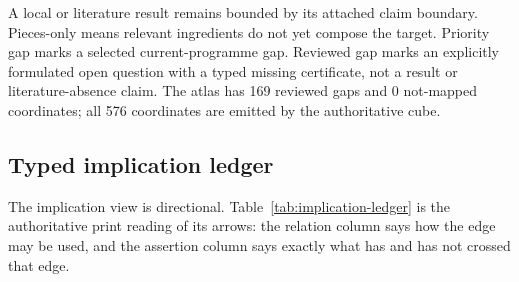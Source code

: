 A local or literature result remains bounded by its attached claim boundary.  Pieces-only means relevant ingredients do not yet compose the target.  Priority gap marks a selected current-programme gap.  Reviewed gap marks an explicitly formulated open question with a typed missing certificate, not a result or literature-absence claim.  The atlas has 169 reviewed gaps and 0 not-mapped coordinates; all 576 coordinates are emitted by the authoritative cube.

\subsection{Typed implication ledger}
\label{app:implication-ledger}
The implication view is directional.  Table~\ref{tab:implication-ledger} is the authoritative print reading of its arrows: the relation column says how the edge may be used, and the assertion column says exactly what has and has not crossed that edge.

